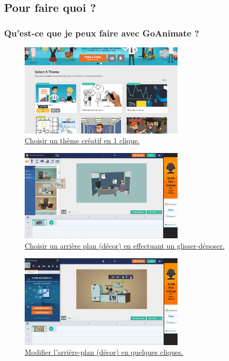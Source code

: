 \subsection{Pour faire quoi ?} 
		\begin{frame}[allowframebreaks]
			\frametitle{Qu'est-ce que je peux faire avec GoAnimate ?}
			\begin{figure}
                     \centering
                     \includegraphics[width = 0.7\textwidth]{theme.png}
                     \caption{\tiny{\href{run:theme.png}{Choisir un thème créatif en 1 clique.}}}
                   \end{figure}
                   
                   \begin{figure}
                     \centering
                     \includegraphics[width = 0.7\textwidth]{decors.png}
                     \caption{\tiny{\href{run:decors.png}{Choisir un arrière plan (décor) en effectuant un glisser-déposer.}}}
                   \end{figure}
                   
                   \begin{figure}
                     \centering
                     \includegraphics[width = 0.7\textwidth]{modifierdecor.png}
                     \caption{\tiny{\href{run:modifierdecor.png}{Modifier l'arrière-plan (décor) en quelques cliques.}}}
                   \end{figure}
                   

\end{frame}
